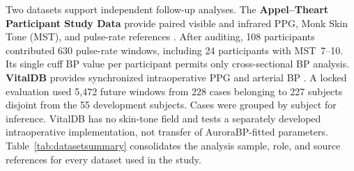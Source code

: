 \documentclass[12pt]{article}
\let\cite\citep
\begin{document}
Two datasets support independent follow-up analyses. The \textbf{Appel--Theart Participant Study Data} provide paired visible and infrared PPG, Monk Skin Tone (MST), and pulse-rate references \cite{appel2025ppg}. After auditing, 108 participants contributed 630 pulse-rate windows, including 24 participants with MST~7--10. Its single cuff BP value per participant permits only cross-sectional BP analysis. \textbf{VitalDB} provides synchronized intraoperative PPG and arterial BP \cite{lee2022vitaldb,vitaldbDataset}. A locked evaluation used 5{,}472 future windows from 228 cases belonging to 227 subjects disjoint from the 55 development subjects. Cases were grouped by subject for inference. VitalDB has no skin-tone field and tests a separately developed intraoperative implementation, not transfer of AuroraBP-fitted parameters.
Table~\ref{tab:datasetsummary} consolidates the analysis sample, role, and source references for every dataset used in the study.
\end{document}
